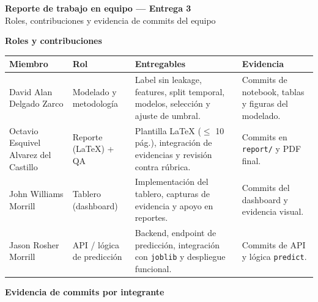 \documentclass[10pt]{article}
\begin{document}
\begin{center}
{\large\bfseries Reporte de trabajo en equipo --- Entrega 3}\\[-2pt]
{\small Roles, contribuciones y evidencia de commits del equipo}
\end{center}


{\scriptsize
\textbf{Roles y contribuciones}

\begin{table}[H]
\centering
\begin{tabularx}{\textwidth}{
>{\RaggedRight\arraybackslash}p{3.25cm}
>{\RaggedRight\arraybackslash}p{1.75cm}
>{\RaggedRight\arraybackslash}X
>{\RaggedRight\arraybackslash}p{2.45cm}}
\toprule
\textbf{Miembro} & \textbf{Rol} & \textbf{Entregables} & \textbf{Evidencia} \\
\midrule
David Alan Delgado Zarco & Modelado y metodología &
Label sin leakage, features, split temporal, modelos, selección y ajuste de umbral. &
Commits de notebook, tablas y figuras del modelado. \\
Octavio Esquivel Alvarez del Castillo & Reporte (LaTeX) + QA &
Plantilla LaTeX ($\leq$ 10 pág.), integración de evidencias y revisión contra rúbrica. &
Commits en \texttt{report/} y PDF final. \\
John Williams Morrill & Tablero (dashboard) &
Implementación del tablero, capturas de evidencia y apoyo en reportes. &
Commits del dashboard y evidencia visual. \\
Jason Rosher Morrill & API / lógica de predicción &
Backend, endpoint de predicción, integración con \texttt{joblib} y despliegue funcional. &
Commits de API y lógica \texttt{predict}. \\
\bottomrule
\end{tabularx}
\end{table}
}

{\scriptsize \textbf{Evidencia de commits por integrante}}
\end{document}
